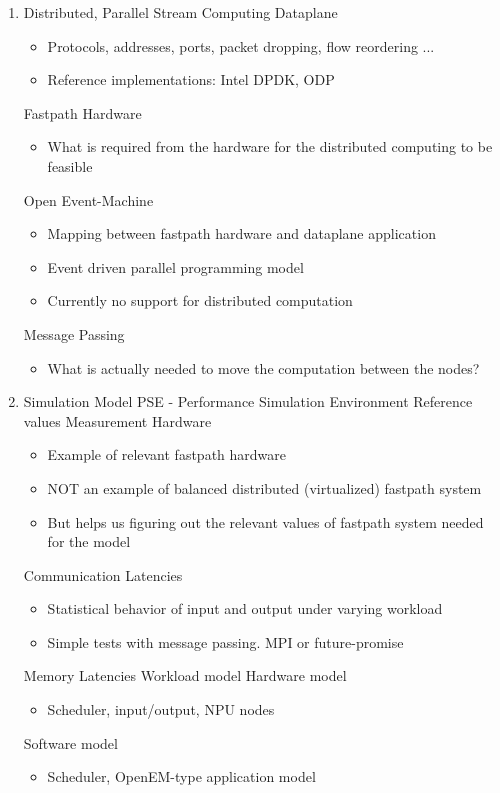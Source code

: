 \begin{enumerate}
\item Distributed, Parallel Stream Computing
  \subitem Dataplane
  \begin{itemize}[leftmargin=45px]
    \item Protocols, addresses, ports, packet dropping, flow reordering ...
    \item Reference implementations: Intel DPDK, ODP
  \end{itemize}
  \subitem Fastpath Hardware
  \begin{itemize}[leftmargin=45px]
    \item What is required from the hardware for the distributed computing to be feasible
  \end{itemize}
  \subitem Open Event-Machine
  \begin{itemize}[leftmargin=45px]
    \item Mapping between fastpath hardware and dataplane application
    \item Event driven parallel programming model
    \item Currently no support for distributed computation
  \end{itemize}
  \subitem Message Passing
  \begin{itemize}[leftmargin=45px]
    \item What is actually needed to move the computation between the nodes?
  \end{itemize}

\item Simulation Model
  \subitem PSE - Performance Simulation Environment
  \subitem Reference values
    \subsubitem Measurement Hardware
    \begin{itemize}[leftmargin=45px]
      \item Example of relevant fastpath hardware
      \item NOT an example of balanced distributed (virtualized) fastpath system
      \item But helps us figuring out the relevant values of fastpath system needed for the model
    \end{itemize}
    \subsubitem Communication Latencies
    \begin{itemize}[leftmargin=45px]
      \item Statistical behavior of input and output under varying workload
      \item Simple tests with message passing. MPI or future-promise
    \end{itemize}
    \subsubitem Memory Latencies
  \subitem Workload model
  \subitem Hardware model
  \begin{itemize}[leftmargin=45px]
    \item Scheduler, input/output, NPU nodes
  \end{itemize}
  \subitem Software model
  \begin{itemize}[leftmargin=45px]
    \item Scheduler, OpenEM-type application model
  \end{itemize}


\end{enumerate}
